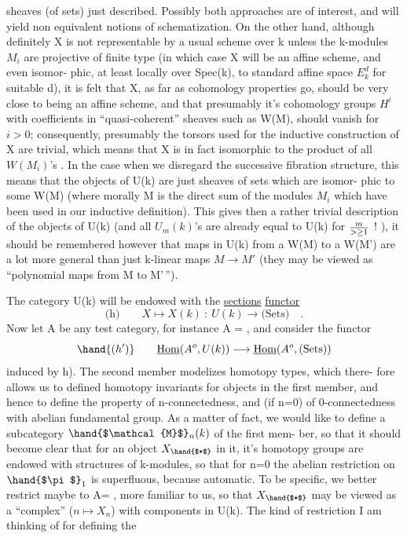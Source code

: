 
sheaves  (of sets) just described.  Possibly both approaches are
of interest,  and will yield non equivalent notions of schematization.
On the other hand,  although definitely X is not representable by a
usual  scheme over k unless the k-modules $M_i$ are projective of
finite type (in which case X will be an affine scheme,  and even isomor-%
phic,  at least locally over Spec(k),  to standard affine space $E_k^d$ for
suitable  d),  it is felt that X,  as far as cohomology properties go,
should be very close to being an affine scheme,  and that presumably
it's cohomology groups $H^i$  with coefficients in ``quasi-coherent'' 
sheaves such as W(M),  should vanish for $i>0$;  consequently,  presumably
the torsors used for the inductive construction of X are trivial,  which
means that X is in fact isomorphic to the product of all $W(M_i)$'s .  In
the case when we disregard the successive fibration structure,  this
means that the objects of U(k) are just sheaves of sets which are isomor-%
phic to some W(M)  (where morally M is the direct sum of the modules $M_i$
which have been used in our inductive definition).  This gives then a
rather trivial description of the objects of U(k) (and all $U_m(k)$'s are
already equal to U(k)\hand{,} for $m \over{>}{\geq} 1$ ! ),  it should be remembered however 
that maps in U(k)  from a W(M) to a W(M')  are a lot more general than
just k-linear maps  $M \to M'$  (they may be viewed as ``polynomial maps
from M to M'\,'').

The category U(k) will be endowed with the \uline{sections} \uline{functor}
\[ \text{(h)} \qquad X \mapsto X(k) \ : \ U(k) \longrightarrow \text{(Sets)} \quad . \]
Now let A be any test category,  for instance A = \hand{$\Delta$},  and consider
the functor
\[ \hand{(h')} \qquad \underline{\mathrm{Hom}}(A^{o},U(k)) \longrightarrow \underline{\mathrm{Hom}}(A^{o},\text{(Sets)}) \]
induced by h).  The second member modelizes homotopy types,  which there-%
fore allows us to defined homotopy invariants for objects in the first
member,  and hence to define the property of n-connectedness,  and (if
n=0)  of 0-connectedness with abelian fundamental group.  As a matter of
fact,  we would like to define a subcategory $\hand{$\mathcal{M}$}_n(k)$   of the first mem-%
ber,  so that it should become clear that for an object $X_{\hand{$*$}}$  in it, it's
homotopy groups are endowed with structures of k-modules,  so that for
n=0  the abelian restriction on $\hand{$\pi$}_1$ is superfluous,  because automatic.
To be specific,  we better restrict maybe to A= \hand{$\Delta$},  more familiar to
us,  so that $X_{\hand{$*$}}$ may be viewed as a ``complex''  ($n \mapsto X_n$)  with components
in U(k).  The kind of restriction I am thinking of for defining the

